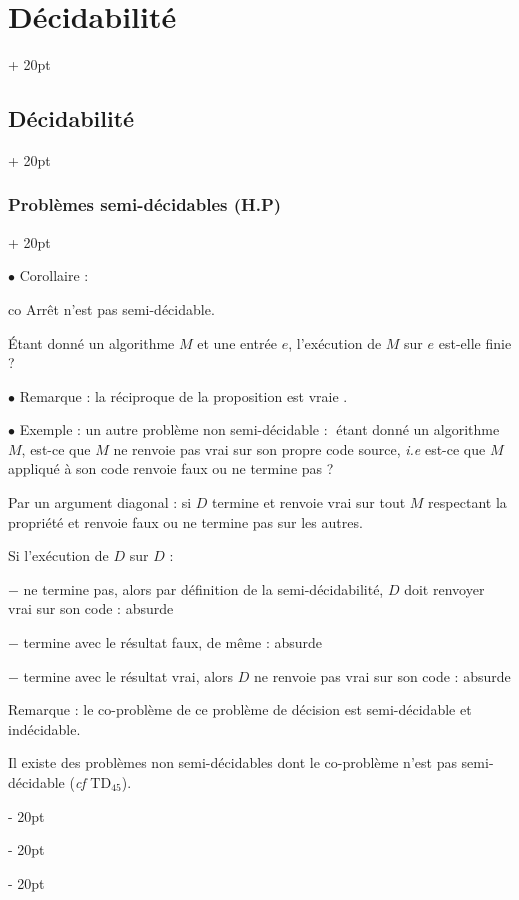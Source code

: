 \documentclass[a4paper, 12pt, twoside]{article}
\newcommand{\simplecit}[1]{\guillemotleft$\;$#1$\;$\guillemotright}
\newcommand{\ind}[1][20pt]{\advance\leftskip + #1}
\newcommand{\deind}[1][20pt]{\advance\leftskip - #1}
\newenvironment{indt}[2][20pt]{#2 \par \ind[#1]}{\par \deind} %
\begin{document}
\begin{indt}{\section{Décidabilité}}
\begin{indt}{\subsection{Décidabilité}}
\begin{indt}{\subsubsection{Problèmes semi-décidables (H.P)}}
                \vspace{12pt}
                
                $\bullet$ Corollaire :
                \begin{emphBox}
                    co Arrêt n'est pas semi-décidable.
                \end{emphBox}

                \'Etant donné un algorithme $M$ et une entrée $e$, l'exécution de $M$ sur $e$ est-elle finie ?

                \vspace{12pt}
                
                $\bullet$ Remarque : la réciproque de la proposition est vraie .

                \vspace{12pt}
                
                $\bullet$ Exemple : un autre problème non semi-décidable : \simplecit{étant donné un algorithme $M$, est-ce que $M$ ne renvoie pas vrai sur son propre code source, \textit{i.e} est-ce que $M$ appliqué à son code renvoie faux ou ne termine pas ?}

                Par un argument diagonal : si $D$ termine et renvoie vrai sur tout $M$ respectant la propriété et renvoie faux ou ne termine pas sur les autres.

                Si l'exécution de $D$ sur $D$ :

                $-$ ne termine pas, alors par définition de la semi-décidabilité, $D$ doit renvoyer vrai sur son code : absurde

                $-$ termine avec le résultat faux, de même : absurde

                $-$ termine avec le résultat vrai, alors $D$ ne renvoie pas vrai sur son code : absurde

                \vspace{21pt}
                
                Remarque : le co-problème de ce problème de décision est semi-décidable et indécidable.

                Il existe des problèmes  non semi-décidables dont le co-problème n'est pas semi-décidable (\textit{cf} TD$_{45}$).
            \end{indt}
        \end{indt}

        \vspace{12pt}
        

\end{indt}
\end{document}
